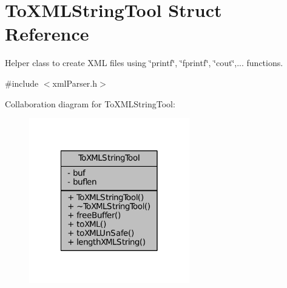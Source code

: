 \hypertarget{structToXMLStringTool}{\section{To\-X\-M\-L\-String\-Tool Struct Reference}
\label{structToXMLStringTool}
}


Helper class to create X\-M\-L files using \char`\"{}printf\char`\"{}, \char`\"{}fprintf\char`\"{}, \char`\"{}cout\char`\"{},... functions.  




{\ttfamily \#include $<$xml\-Parser.\-h$>$}



Collaboration diagram for To\-X\-M\-L\-String\-Tool\-:
\nopagebreak
\begin{figure}[H]
\begin{center}
\leavevmode
\includegraphics[width=198pt]{structToXMLStringTool__coll__graph}
\end{center}
\end{figure}
